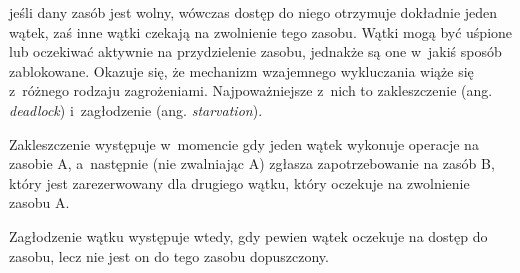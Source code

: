 \documentclass{mwart}
\begin{document}
	jeśli dany zasób jest wolny, wówczas dostęp do niego otrzymuje dokładnie jeden wątek, zaś inne wątki czekają na zwolnienie tego zasobu.
	Wątki mogą być uśpione lub oczekiwać aktywnie na przydzielenie zasobu, jednakże są one w~jakiś sposób zablokowane.  
	Okazuje się, że mechanizm wzajemnego wykluczania wiąże się z~różnego rodzaju zagrożeniami. Najpoważniejsze z~nich to zakleszczenie 
	(ang. \emph{deadlock}) i~zagłodzenie (ang. \emph{starvation}).
\par
%
\indent
	Zakleszczenie występuje w~momencie gdy jeden wątek wykonuje operacje na zasobie A, a~następnie (nie zwalniając A) zgłasza zapotrzebowanie
	na zasób B, który jest zarezerwowany dla drugiego wątku, który oczekuje na zwolnienie zasobu A.
\par
%
\indent
	Zagłodzenie wątku występuje wtedy, gdy pewien wątek oczekuje na dostęp do zasobu, lecz nie jest on do tego zasobu dopuszczony.
\par
\end{document}
